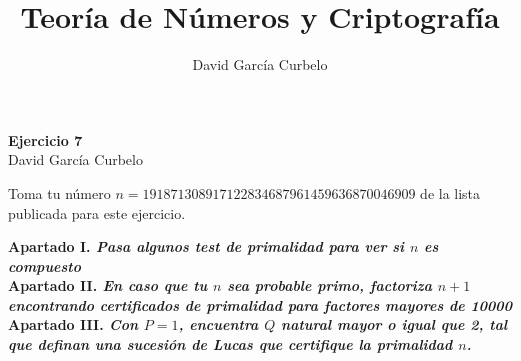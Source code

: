 \documentclass[fleqn]{article}
\author{David García Curbelo}
\title{Teoría de Números y Criptografía}
\begin{document}
    \begin{center}
        \LARGE{\textbf{Ejercicio 7}} \\
        \Large{David García Curbelo} \\
    \end{center}

    \vspace{1cm}
    Toma tu número $n=191871308917122834687961459636870046909$ de la lista publicada para este ejercicio.


    \textbf{Apartado I. \textit{Pasa algunos test de primalidad para ver si $n$ es compuesto}}\\

    
    \newpage
    \textbf{Apartado II. \textit{En caso que tu $n$ sea probable primo, factoriza $n+1$ encontrando certificados de primalidad 
            para factores mayores de 10000}}\\

    \newpage
    \textbf{Apartado III. \textit{Con $P=1$, encuentra $Q$ natural mayor o igual que 2, tal que definan una sucesión de
            Lucas que certifique la primalidad $n$.}} \\
\end{document}
